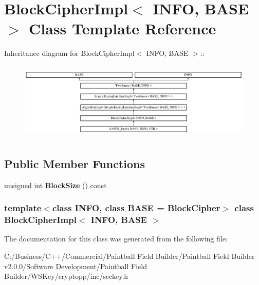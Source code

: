\hypertarget{class_block_cipher_impl}{
\section{BlockCipherImpl$<$ INFO, BASE $>$ Class Template Reference}
\label{class_block_cipher_impl}
}
Inheritance diagram for BlockCipherImpl$<$ INFO, BASE $>$::\begin{figure}[H]
\begin{center}
\leavevmode
\includegraphics[height=3.78378cm]{class_block_cipher_impl}
\end{center}
\end{figure}
\subsection*{Public Member Functions}
\begin{DoxyCompactItemize}
\item 
\hypertarget{class_block_cipher_impl_ac6fb64d3b68308c15f5abfdb674e9cd4}{
unsigned int {\bfseries BlockSize} () const }
\label{class_block_cipher_impl_ac6fb64d3b68308c15f5abfdb674e9cd4}

\end{DoxyCompactItemize}
\subsubsection*{template$<$class INFO, class BASE = BlockCipher$>$ class BlockCipherImpl$<$ INFO, BASE $>$}



The documentation for this class was generated from the following file:\begin{DoxyCompactItemize}
\item 
C:/Business/C++/Commercial/Paintball Field Builder/Paintball Field Builder v2.0.0/Software Development/Paintball Field Builder/WSKey/cryptopp/inc/seckey.h\end{DoxyCompactItemize}

